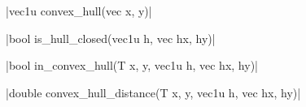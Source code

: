 \funcitem \cppinline|vec1u convex_hull(vec x, y)| 

\funcitem \cppinline|bool is_hull_closed(vec1u h, vec hx, hy)| 

\funcitem \vectorfunc \cppinline|bool in_convex_hull(T x, y, vec1u h, vec hx, hy)| 

\funcitem \vectorfunc \cppinline|double convex_hull_distance(T x, y, vec1u h, vec hx, hy)| 
